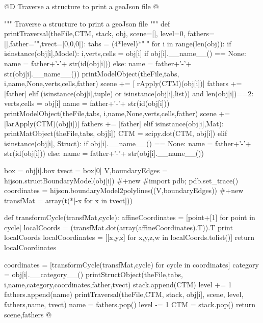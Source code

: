 \documentclass[11pt,oneside]{article}	%
\begin{document}
@D Traverse a structure to print a geoJson file
@{""" Traverse a structure to print a geoJson file """
def printTraversal(theFile,CTM, stack, obj, scene=[], level=0, fathers=[],father="",tvect=[0,0,0]):
   tabs = (4*level)*" "
   for i in range(len(obj)):
      if isinstance(obj[i],Model): 
         i,verts,cells = obj[i]
         if obj[i].__name__() == None:
            name = father+'-'+ str(id(obj[i]))
         else: 
            name = father+'-'+ str(obj[i].__name__())
         printModelObject(theFile,tabs, i,name,None,verts,cells,father)
         scene += [ rApply(CTM)(obj[i])]
         fathers += [father]
      elif (isinstance(obj[i],tuple) or isinstance(obj[i],list)) and len(obj[i])==2:
         verts,cells = obj[i]
         name = father+'-'+ str(id(obj[i]))
         printModelObject(theFile,tabs, i,name,None,verts,cells,father)
         scene += [larApply(CTM)(obj[i])]
         fathers += [father]
      elif isinstance(obj[i],Mat): 
         printMatObject(theFile,tabs, obj[i])
         CTM = scipy.dot(CTM,  obj[i])
      elif isinstance(obj[i], Struct):
         if obj[i].__name__() == None:
            name = father+'-'+ str(id(obj[i]))
         else: 
            name = father+'-'+ str(obj[i].__name__())
            
         box = obj[i].box
         tvect = box[0]
         V,boundaryEdges = hijson.structBoundaryModel(obj[i])   #+new
         #import pdb; pdb.set_trace()
         coordinates = hijson.boundaryModel2polylines((V,boundaryEdges))  #+new
         transfMat = array(t(*[-x for x in tvect]))
         
         def transformCycle(transfMat,cycle):
             affineCoordinates = [point+[1] for point in cycle]
             localCoords = (transfMat.dot(array(affineCoordinates).T)).T
             print localCoords
             localCoordinates = [[x,y,z] for x,y,z,w in localCoords.tolist()]
             return localCoordinates
             
         coordinates = [transformCycle(transfMat,cycle) for cycle in coordinates]
         category = obj[i].__category__()
         printStructObject(theFile,tabs, i,name,category,coordinates,father,tvect)
         stack.append(CTM) 
         level += 1
         fathers.append(name)
         printTraversal(theFile,CTM, stack, obj[i], scene, level, fathers,name, tvect)
         name = fathers.pop()
         level -= 1
         CTM = stack.pop()
   return scene,fathers
@}
\end{document}
